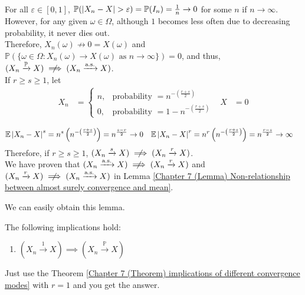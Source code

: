 \documentclass{huhtakm-template-book}
\newcommand{\prob}{\mathbb{P}}
\newcommand{\expect}{\mathbb{E}}
\begin{document}
\begin{proofing}
\begin{enumerate}
\begin{align*}
		\end{align*}
		For all $\varepsilon\in[0,1]$, $\prob(\abs{X_{n}-X}>\varepsilon)=\prob(I_{n})=\frac{1}{n}\to 0$ for some $n$ if $n\to\infty$.\\
		However, for any given $\omega\in\Omega$, although $1$ becomes less often due to decreasing probability, it never dies out.\\
		Therefore, $X_{n}(\omega)\not\to 0=X(\omega)$ and $\prob(\{\omega\in\Omega:X_{n}(\omega)\to X(\omega)\text{ as }n\to\infty\})=0$, and thus, $(X_{n}\xrightarrow{\prob}X)\centernot\implies(X_{n}\xrightarrow{\text{a.s.}}X)$.\\
		If $r\geq s\geq 1$, let
		\begin{align*}
			X_{n}&=\begin{cases}
				n, &\text{probability }=n^{-\left(\frac{r+s}{2}\right)}\\
				0, &\text{probability }=1-n^{-\left(\frac{r+s}{2}\right)}
			\end{cases} & X&=0
		\end{align*}
		
		\begin{align*}
			\expect\abs{X_{n}-X}^{s}&=n^{s}\left(n^{-\left(\frac{r+s}{2}\right)}\right)=n^{\frac{s-r}{2}}\to 0 & \expect\abs{X_{n}-X}^{r}&=n^{r}\left(n^{-\left(\frac{r+s}{2}\right)}\right)=n^{\frac{r-s}{2}}\to\infty
		\end{align*}
		Therefore, if $r\geq s\geq 1$, $(X_{n}\xrightarrow{s}X)\centernot\implies(X_{n}\xrightarrow{r}X)$.\\
		We have proven that $(X_{n}\xrightarrow{\text{a.s.}}X)\centernot\implies(X_{n}\xrightarrow{r}X)$ and $(X_{n}\xrightarrow{r}X)\centernot\implies(X_{n}\xrightarrow{\text{a.s.}}X)$ in Lemma \ref{Chapter 7 (Lemma) Non-relationship between almost surely convergence and mean}.
	\end{enumerate}
\end{proofing}
We can easily obtain this lemma.
\begin{lem}
	The following implications hold:
	\begin{enumerate}
		\item $(X_{n}\xrightarrow{1}X)\implies(X_{n}\xrightarrow{\prob}X)$
	\end{enumerate}
\end{lem}
\begin{proofing}
	Just use the Theorem \ref{Chapter 7 (Theorem) implications of different convergence modes} with $r=1$ and you get the answer.
\end{proofing}
\end{document}
